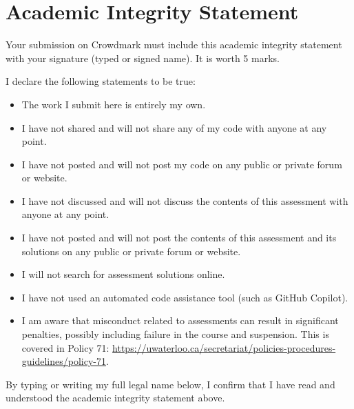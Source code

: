\documentclass[12pt]{article}
\begin{document}
\section*{Academic Integrity Statement}

{\color{red} Your submission on Crowdmark must include this academic integrity statement with your signature (typed or signed name). It is worth 5 marks.} 

I declare the following statements to be true:

\begin{itemize}
\item 
The work I submit here is entirely my own.

\item 	
I have not shared and will not share any of my code with anyone at any point. 

\item 
I have not posted and will not post my code on any public or private forum or website.

\item 	
I have not discussed and will not discuss the contents of this assessment with anyone at any point.

\item 
I have not posted and will not post the contents of this assessment and its solutions on any public or private forum or website. 

\item 
I will not search for assessment solutions online.

\item
I have not used an automated code assistance tool (such as GitHub Copilot).

\item 
I am aware that misconduct related to assessments can result in significant penalties, possibly including failure in the course and suspension. This is covered in Policy 71: \url{https://uwaterloo.ca/secretariat/policies-procedures-guidelines/policy-71}.
\end{itemize}

By typing or writing my full legal name below, I confirm that I have read and understood the academic integrity statement above.

\vspace{30pt}

\begin{minipage}{12cm}
\hrulefill
\end{minipage}
\end{document}

